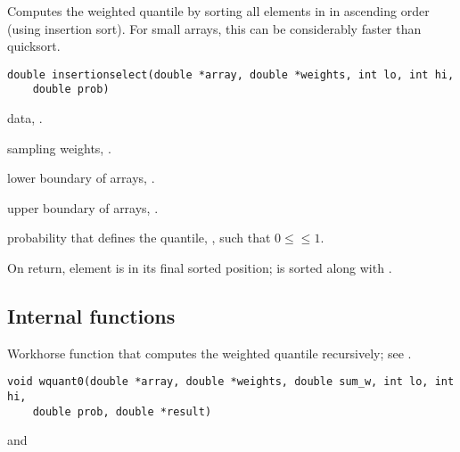 \documentclass[a4paper,oneside,10pt,DIV=12]{scrartcl}
\def\DATA#1#2#3{
	\item[\code{#1}] #2, \code{double array[#3]}.}
\def\WEIGHTS#1{
	\item[\code{#1}] sampling weights, \code{double array[n]}.
}
\begin{document}
\begin{Description}
Computes the weighted quantile by sorting all elements in  in
ascending order (using insertion sort). For small arrays, this can be
considerably faster than quicksort.
\end{Description}
\begin{Usage}
\begin{verbatim}
double insertionselect(double *array, double *weights, int lo, int hi,
    double prob)
\end{verbatim}
\end{Usage}
\begin{Arguments}
	\begin{ldescription}
		\DATA{array}{data}{n}
		\WEIGHTS{weights}
		\item[\code{lo}] lower boundary of arrays, \code{[int]}.
		\item[\code{hi}] upper boundary of arrays, \code{[int]}.
		\item[\code{prob}] probability that defines the quantile,
			, such that $0 \leq$$\leq 1$.
	\end{ldescription}
\end{Arguments}
\begin{Dependency}
\end{Dependency}
\begin{Value}
On return, element  is in its final sorted position;
 is sorted along with .
\end{Value}

\clearpage
\subsection*{Internal functions}
%

\begin{Description}
Workhorse function that computes the weighted quantile recursively; see
.
\end{Description}
\begin{Usage}
\begin{verbatim}
void wquant0(double *array, double *weights, double sum_w, int lo, int hi,
    double prob, double *result)
\end{verbatim}
\end{Usage}
\begin{Dependencies}
	 and
\end{Dependencies}
\end{document}
